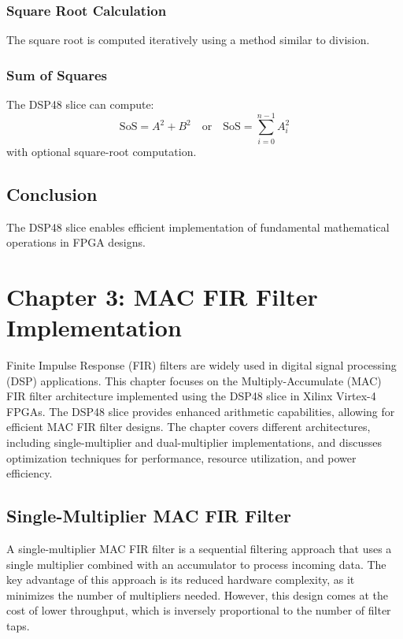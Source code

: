 \documentclass{article}
\begin{document}
	\subsubsection{Square Root Calculation}
	The square root is computed iteratively using a method similar to division.
	
	\subsubsection{Sum of Squares}
	The DSP48 slice can compute:
	\[
	\text{SoS} = A^2 + B^2 \quad \text{or} \quad \text{SoS} = \sum_{i=0}^{n-1} A_i^2
	\]
	with optional square-root computation.
	
	\subsection{Conclusion}
	The DSP48 slice enables efficient implementation of fundamental mathematical operations in FPGA designs.
	
	
	\section{Chapter 3: MAC FIR Filter Implementation}
	Finite Impulse Response (FIR) filters are widely used in digital signal processing (DSP) applications. This chapter focuses on the Multiply-Accumulate (MAC) FIR filter architecture implemented using the DSP48 slice in Xilinx Virtex-4 FPGAs. The DSP48 slice provides enhanced arithmetic capabilities, allowing for efficient MAC FIR filter designs. The chapter covers different architectures, including single-multiplier and dual-multiplier implementations, and discusses optimization techniques for performance, resource utilization, and power efficiency.
	
	\subsection{Single-Multiplier MAC FIR Filter}
	A single-multiplier MAC FIR filter is a sequential filtering approach that uses a single multiplier combined with an accumulator to process incoming data. The key advantage of this approach is its reduced hardware complexity, as it minimizes the number of multipliers needed. However, this design comes at the cost of lower throughput, which is inversely proportional to the number of filter taps.
	
\end{document}
